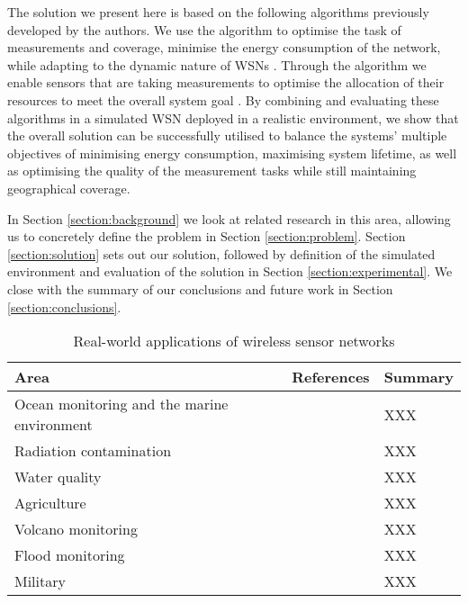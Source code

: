 The solution we present here is based on the following algorithms previously developed by the authors. We use the \acronymATARIA{}{} algorithm to optimise the task of measurements and coverage, minimise the energy consumption of the network, while adapting to the dynamic nature of WSNs \citep{creech2021dynamic}. Through the \acronymMGRAO{}{} algorithm we enable sensors that are taking measurements to optimise the allocation of their resources to meet the overall system goal \citep{creech2021resource}. By combining and evaluating these algorithms in a simulated WSN deployed in a realistic environment, we show that the overall solution can be successfully utilised to balance the systems' multiple objectives of minimising energy consumption, maximising system lifetime, as well as optimising the quality of the measurement tasks while still maintaining geographical coverage.

In Section \ref{section:background} we look at related research in this area, allowing us to concretely define the problem in Section \ref{section:problem}. Section \ref{section:solution} sets out our solution, followed by definition of the simulated environment and evaluation of the solution in Section \ref{section:experimental}. We close with the summary of our conclusions and future work in Section \ref{section:conclusions}.


\begin{table}
	\footnotesize
	\begin{tabular}{|p{}|p{}|p{}|}
		\hline
		Area & References & Summary \\
		\hline
		Ocean monitoring and the marine environment & \cite{Mahdy2008a, Albaladejo2010, 6973877} & XXX \\
		Radiation contamination & \cite{Gomez2015} & XXX \\
		Water quality & \cite{Fang2010} & XXX \\
		Agriculture  & \cite{8745854} & XXX \\
		Volcano monitoring  & \cite{Werner-Allen2006} & XXX \\
		Flood monitoring  & \cite{Castillo-effen2004} & XXX \\
		Military & \cite{6268958} & XXX \\
		\hline
	\end{tabular}
	\caption{Real-world applications of wireless sensor networks}
	\label{table:applications}	
\end{table}
